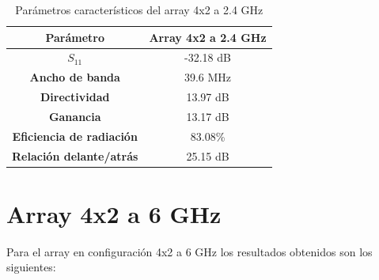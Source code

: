 \begin{table}[H]
  
   
   \small %
   \centering %
   \begin{tabular}{c c} %
   \toprule[\heavyrulewidth]\toprule[\heavyrulewidth]
   \textbf{Parámetro} & \textbf{Array 4x2 a 2.4 GHz} \\ 
   \midrule
   \textbf{$S_{11}$} & -32.18 dB \\
   \textbf{Ancho de banda} & 39.6 MHz \\
   \textbf{Directividad} & 13.97 dB \\
   \textbf{Ganancia} & 13.17 dB \\
   \textbf{Eficiencia de radiación} & 83.08\% \\
   \textbf{Relación delante/atrás} & 25.15 dB \\

   \bottomrule[\heavyrulewidth] 
   \end{tabular}
   
   \caption{Parámetros característicos del array 4x2 a 2.4 GHz} 
   \label{tab:res4x21}
\end{table}





















\newpage
\section{Array 4x2 a 6 GHz}
\par Para el array en configuración 4x2 a 6 GHz los resultados obtenidos son los siguientes:

